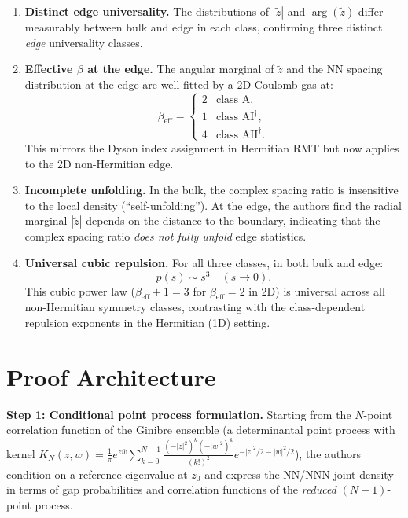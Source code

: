 \documentclass[11pt,a4paper]{article}
\theoremstyle{definition}
\begin{document}
\begin{enumerate}[nosep]
  \item \textbf{Distinct edge universality.}  The distributions of $|\tilde z|$ and $\arg(\tilde z)$ differ measurably between bulk and edge in each class, confirming three distinct \emph{edge} universality classes.

  \item \textbf{Effective $\beta$ at the edge.}  The angular marginal of $\tilde{z}$ and the NN spacing distribution at the edge are well-fitted by a 2D Coulomb gas at:
  \[
    \beta_{\mathrm{eff}} = \begin{cases} 2 & \text{class A},\\ 1 & \text{class AI}^\dagger,\\ 4 & \text{class AII}^\dagger.\end{cases}
  \]
  This mirrors the Dyson index assignment in Hermitian RMT but now applies to the 2D non-Hermitian edge.

  \item \textbf{Incomplete unfolding.}  In the bulk, the complex spacing ratio is insensitive to the local density (``self-unfolding'').  At the edge, the authors find the radial marginal $|\tilde z|$ depends on the distance to the boundary, indicating that the complex spacing ratio \emph{does not fully unfold} edge statistics.

  \item \textbf{Universal cubic repulsion.}  For all three classes, in both bulk and edge:
  \[
    p(s) \sim s^3 \quad (s\to 0).
  \]
  This cubic power law ($\beta_{\mathrm{eff}}+1 = 3$ for $\beta_{\mathrm{eff}}=2$ in 2D) is universal across all non-Hermitian symmetry classes, contrasting with the class-dependent repulsion exponents in the Hermitian (1D) setting.
\end{enumerate}

\section{Proof Architecture}

\textbf{Step 1: Conditional point process formulation.}
Starting from the $N$-point correlation function of the Ginibre ensemble (a determinantal point process with kernel $K_N(z,w) = \frac{1}{\pi} e^{z\bar w} \sum_{k=0}^{N-1} \frac{(-|z|^2)^k(-|w|^2)^k}{(k!)^2} e^{-|z|^2/2 - |w|^2/2}$), the authors condition on a reference eigenvalue at $z_0$ and express the NN/NNN joint density in terms of gap probabilities and correlation functions of the \emph{reduced} $(N-1)$-point process.
\end{document}
